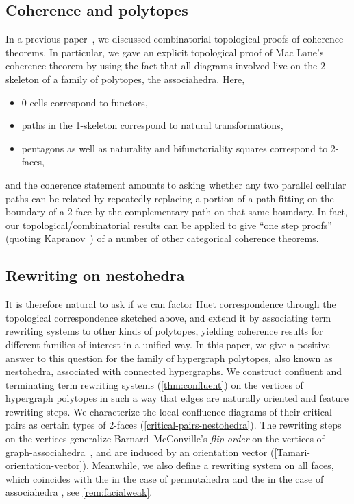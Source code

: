  

\subsection*{Coherence and polytopes}

In a previous paper~\cite{CLA1}, we discussed combinatorial topological proofs of coherence theorems.
In particular, we gave an explicit  topological proof of Mac Lane's coherence theorem by using the fact that all diagrams involved live on the $2$-skeleton of a family of polytopes, the associahedra. 
Here, 
\begin{itemize}
\item[(0)] 0-cells correspond to functors, 
\item[(1)] paths in the 1-skeleton correspond to natural transformations,  
\item[(2)]pentagons as well as naturality and bifunctoriality squares correspond to 2-faces,  
\end{itemize}
and the coherence statement amounts to asking whether any two parallel cellular paths can be related by repeatedly replacing a portion of a path fitting on the boundary of a $2$-face by the complementary path on that same boundary.
In fact, our topological/combinatorial results can be applied to give ``one step proofs'' (quoting Kapranov~\cite{kapranov1993}) of a number of other categorical coherence theorems. 

\subsection*{Rewriting on nestohedra}

It is therefore natural to ask if we can factor Huet correspondence through the topological correspondence sketched above,  and extend it by associating  term rewriting systems to other kinds of polytopes, yielding  coherence results for different families of interest in a unified way.
In this paper, we give a positive answer to this question for the family of hypergraph polytopes, also known as nestohedra, associated with connected hypergraphs. 
We construct confluent  and terminating  term rewriting systems (\cref{thm:confluent}) on the vertices of hypergraph polytopes in such a way that edges are naturally oriented and feature rewriting steps.
We characterize the local confluence diagrams of their critical pairs as certain types of $2$-faces (\cref{critical-pairs-nestohedra}).
The rewriting steps on the vertices generalize Barnard--McConville's \emph{flip order} on the vertices of graph-associahedra~\cite{Barnard-McConville}, and are induced by an orientation vector (\cref{Tamari-orientation-vector}).
Meanwhile, we also define a rewriting system on all faces, which coincides with the  in the case of permutahedra \cite{KrobLatapyNovelliPhanSchwer,PalaciosRonco,DermenjianHohlwegPilaud} and the  in the case of associahedra \cite{PalaciosRonco}, see \cref{rem:facialweak}.

